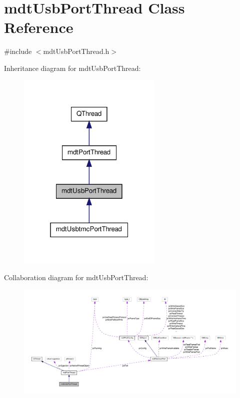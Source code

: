 \hypertarget{classmdt_usb_port_thread}{\section{mdt\-Usb\-Port\-Thread Class Reference}
\label{classmdt_usb_port_thread}
}


{\ttfamily \#include $<$mdt\-Usb\-Port\-Thread.\-h$>$}



Inheritance diagram for mdt\-Usb\-Port\-Thread\-:\nopagebreak
\begin{figure}[H]
\begin{center}
\leavevmode
\includegraphics[width=196pt]{classmdt_usb_port_thread__inherit__graph}
\end{center}
\end{figure}


Collaboration diagram for mdt\-Usb\-Port\-Thread\-:\nopagebreak
\begin{figure}[H]
\begin{center}
\leavevmode
\includegraphics[width=350pt]{classmdt_usb_port_thread__coll__graph}
\end{center}
\end{figure}
